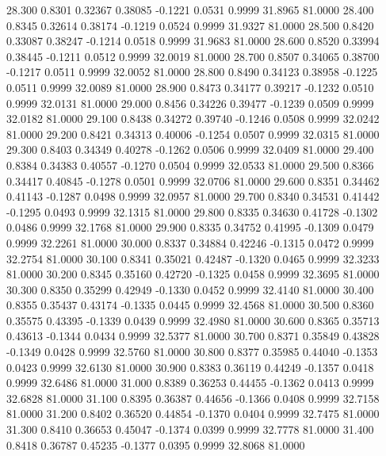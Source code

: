   28.300   0.8301   0.32367   0.38085  -0.1221   0.0531   0.9999  31.8965  81.0000
  28.400   0.8345   0.32614   0.38174  -0.1219   0.0524   0.9999  31.9327  81.0000
  28.500   0.8420   0.33087   0.38247  -0.1214   0.0518   0.9999  31.9683  81.0000
  28.600   0.8520   0.33994   0.38445  -0.1211   0.0512   0.9999  32.0019  81.0000
  28.700   0.8507   0.34065   0.38700  -0.1217   0.0511   0.9999  32.0052  81.0000
  28.800   0.8490   0.34123   0.38958  -0.1225   0.0511   0.9999  32.0089  81.0000
  28.900   0.8473   0.34177   0.39217  -0.1232   0.0510   0.9999  32.0131  81.0000
  29.000   0.8456   0.34226   0.39477  -0.1239   0.0509   0.9999  32.0182  81.0000
  29.100   0.8438   0.34272   0.39740  -0.1246   0.0508   0.9999  32.0242  81.0000
  29.200   0.8421   0.34313   0.40006  -0.1254   0.0507   0.9999  32.0315  81.0000
  29.300   0.8403   0.34349   0.40278  -0.1262   0.0506   0.9999  32.0409  81.0000
  29.400   0.8384   0.34383   0.40557  -0.1270   0.0504   0.9999  32.0533  81.0000
  29.500   0.8366   0.34417   0.40845  -0.1278   0.0501   0.9999  32.0706  81.0000
  29.600   0.8351   0.34462   0.41143  -0.1287   0.0498   0.9999  32.0957  81.0000
  29.700   0.8340   0.34531   0.41442  -0.1295   0.0493   0.9999  32.1315  81.0000
  29.800   0.8335   0.34630   0.41728  -0.1302   0.0486   0.9999  32.1768  81.0000
  29.900   0.8335   0.34752   0.41995  -0.1309   0.0479   0.9999  32.2261  81.0000
  30.000   0.8337   0.34884   0.42246  -0.1315   0.0472   0.9999  32.2754  81.0000
  30.100   0.8341   0.35021   0.42487  -0.1320   0.0465   0.9999  32.3233  81.0000
  30.200   0.8345   0.35160   0.42720  -0.1325   0.0458   0.9999  32.3695  81.0000
  30.300   0.8350   0.35299   0.42949  -0.1330   0.0452   0.9999  32.4140  81.0000
  30.400   0.8355   0.35437   0.43174  -0.1335   0.0445   0.9999  32.4568  81.0000
  30.500   0.8360   0.35575   0.43395  -0.1339   0.0439   0.9999  32.4980  81.0000
  30.600   0.8365   0.35713   0.43613  -0.1344   0.0434   0.9999  32.5377  81.0000
  30.700   0.8371   0.35849   0.43828  -0.1349   0.0428   0.9999  32.5760  81.0000
  30.800   0.8377   0.35985   0.44040  -0.1353   0.0423   0.9999  32.6130  81.0000
  30.900   0.8383   0.36119   0.44249  -0.1357   0.0418   0.9999  32.6486  81.0000
  31.000   0.8389   0.36253   0.44455  -0.1362   0.0413   0.9999  32.6828  81.0000
  31.100   0.8395   0.36387   0.44656  -0.1366   0.0408   0.9999  32.7158  81.0000
  31.200   0.8402   0.36520   0.44854  -0.1370   0.0404   0.9999  32.7475  81.0000
  31.300   0.8410   0.36653   0.45047  -0.1374   0.0399   0.9999  32.7778  81.0000
  31.400   0.8418   0.36787   0.45235  -0.1377   0.0395   0.9999  32.8068  81.0000
